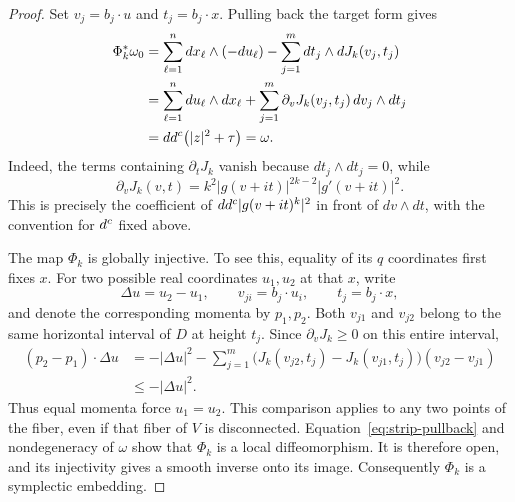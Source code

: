 \begin{proof}
Set $v_j=b_j\cdot u$ and $t_j=b_j\cdot x$. Pulling back the target
form gives
\begin{align}
 \Phi_k^*\omega_0
 &=\sum_{\ell=1}^n dx_\ell\wedge(-du_\ell)
       -\sum_{j=1}^m dt_j\wedge dJ_k(v_j,t_j)\notag\\
 &=\sum_{\ell=1}^n du_\ell\wedge dx_\ell
       +\sum_{j=1}^m
          \partial_vJ_k(v_j,t_j)\,dv_j\wedge dt_j\notag\\
 &=dd^c\bigl(|z|^2+\tau\bigr)=\omega.
 \label{eq:strip-pullback}
\end{align}
Indeed, the terms containing $\partial_tJ_k$ vanish because
$dt_j\wedge dt_j=0$, while
\[
 \partial_vJ_k(v,t)=k^2|g(v+it)|^{2k-2}|g'(v+it)|^2.
\]
This is precisely the coefficient of $dd^c|g(v+it)^k|^2$ in front of
$dv\wedge dt$, with the convention for $d^c$ fixed above.

The map $\Phi_k$ is globally injective. To see this, equality of its
$q$ coordinates first fixes $x$. For two possible real coordinates
$u_1,u_2$ at that $x$, write
\[
 \Delta u=u_2-u_1,\qquad
 v_{ji}=b_j\cdot u_i,\qquad t_j=b_j\cdot x,
\]
and denote the corresponding momenta by $p_1,p_2$. Both $v_{j1}$ and
$v_{j2}$ belong to the same horizontal interval of $D$ at height $t_j$.
Since $\partial_vJ_k\ge0$ on this entire interval,
\begin{align*}
 (p_2-p_1)\cdot\Delta u
 &=-|\Delta u|^2
   -\sum_{j=1}^m
     \bigl(J_k(v_{j2},t_j)-J_k(v_{j1},t_j)\bigr)
     (v_{j2}-v_{j1})\\
 &\le -|\Delta u|^2.
\end{align*}
Thus equal momenta force $u_1=u_2$. This comparison applies to any two
points of the fiber, even if that fiber of $V$ is disconnected.
Equation~\eqref{eq:strip-pullback} and nondegeneracy of $\omega$ show that
$\Phi_k$ is a local diffeomorphism. It is therefore open, and its
injectivity gives a smooth inverse onto its image. Consequently
$\Phi_k$ is a symplectic embedding.


\end{proof}
